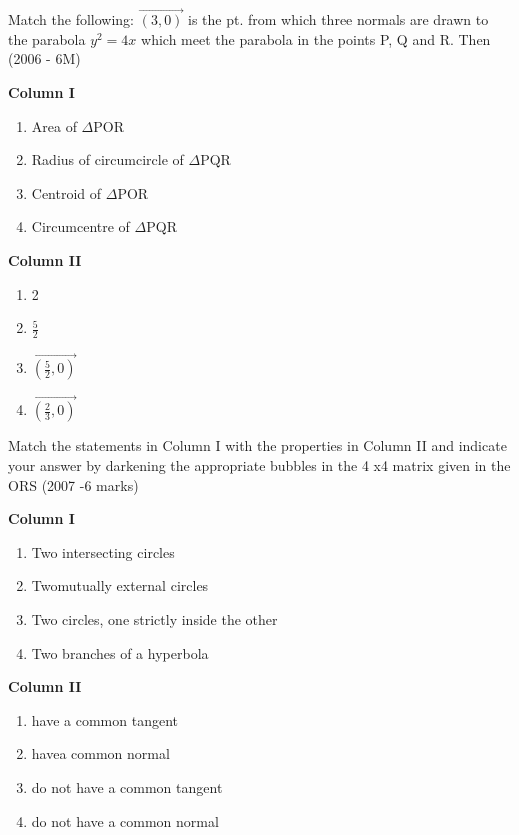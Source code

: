 \iffalse
\title{Assignment 1}
\author{Teja Vardhan}
\section{matrix-match}
\fi

	\item   Match the following: $\vec{(3,0)}$ is the pt. from which three normals are drawn to the parabola $y^2 = 4x$ which meet the parabola in the points P, Q and R. Then \hfill{(2006 - 6M)}
\begin{multicols}{2}
\textbf{Column I}
\begin{enumerate}
    \item Area of $\Delta$POR 
    \item Radius of circumcircle of $\Delta$PQR
    \item Centroid of $\Delta$POR 
    \item  Circumcentre of $\Delta$PQR 
\end{enumerate} 

\textbf{Column II}
\begin{enumerate}
    \item 2
    \item $\frac{5}{2}$
    \item $\vec{(\frac{5}{2},0)}$
    \item $\vec{(\frac{2}{3},0)}$
\end{enumerate}
\end{multicols}

\item Match the statements in Column I with the properties in Column II and indicate your answer by darkening the appropriate bubbles in the 4 x4 matrix given in the ORS  \hfill{(2007 -6 marks)}

\begin{multicols}{2}
\textbf{Column I}
\begin{enumerate}
    \item  Two intersecting circles
    \item Twomutually external circles
    \item Two circles, one strictly inside the other 
    \item  Two branches of a hyperbola  
\end{enumerate} 

\textbf{Column II}
\begin{enumerate}
    \item have a common tangent 
    \item havea common normal 
    \item do not have a common tangent
    \item do not have a common normal
\end{enumerate}
\end{multicols}


